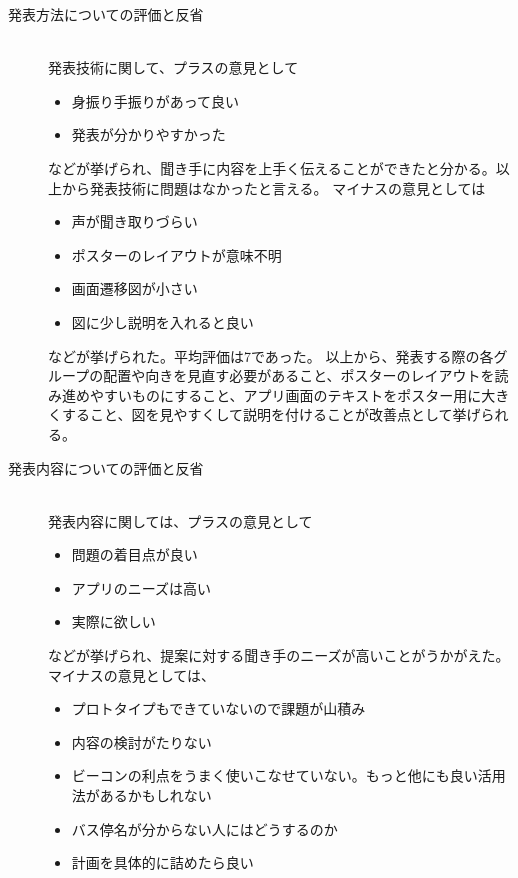 \documentclass[openany,11pt,papersize]{jsbook}
\begin{document}
\begin{description}
\item[発表方法についての評価と反省]\mbox{}\\
発表技術に関して、プラスの意見として
\begin{itemize}

\item 身振り手振りがあって良い
\item 発表が分かりやすかった

\end{itemize}
などが挙げられ、聞き手に内容を上手く伝えることができたと分かる。以上から発表技術に問題はなかったと言える。
マイナスの意見としては
\begin{itemize}

\item 声が聞き取りづらい
\item ポスターのレイアウトが意味不明
\item 画面遷移図が小さい
\item 図に少し説明を入れると良い

\end{itemize}
などが挙げられた。平均評価は7であった。
以上から、発表する際の各グループの配置や向きを見直す必要があること、ポスターのレイアウトを読み進めやすいものにすること、アプリ画面のテキストをポスター用に大きくすること、図を見やすくして説明を付けることが改善点として挙げられる。


\item[発表内容についての評価と反省]\mbox{}\\
発表内容に関しては、プラスの意見として
\begin{itemize}

\item 問題の着目点が良い
\item アプリのニーズは高い
\item 実際に欲しい

\end{itemize}
などが挙げられ、提案に対する聞き手のニーズが高いことがうかがえた。マイナスの意見としては、
\begin{itemize}

\item プロトタイプもできていないので課題が山積み
\item 内容の検討がたりない
\item ビーコンの利点をうまく使いこなせていない。もっと他にも良い活用法があるかもしれない
\item バス停名が分からない人にはどうするのか
\item 計画を具体的に詰めたら良い


\end{itemize}
\end{description}
\end{document}

